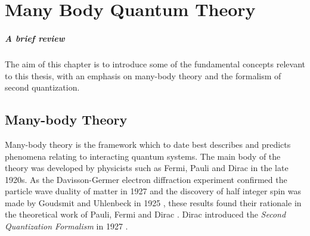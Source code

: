 

\chapter{Many Body Quantum Theory} %

\label{Chapter1} %



\paragraph{A brief review} The aim of this chapter is to introduce some of the  fundamental concepts relevant to this thesis, with an emphasis on many-body theory and the formalism of second quantization.


\section{Many-body Theory}

Many-body theory is the framework which to date best describes and
predicts phenomena relating to interacting quantum systems. The main
body of the theory was developed by physicists such as Fermi, Pauli
and Dirac in the late 1920s. As the Davisson-Germer electron
diffraction experiment confirmed the particle wave duality of matter
in 1927 \cite{Giuliani2005} and the discovery of half integer spin was
made by Goudsmit and Uhlenbeck in 1925 \cite{Giuliani2005}, these
results found their rationale in the theoretical work of Pauli, Fermi
and Dirac \cite{Giuliani2005}. Dirac introduced the 
\emph{Second Quantization Formalism} in 1927 \cite{ShavittBartlett2009}.

